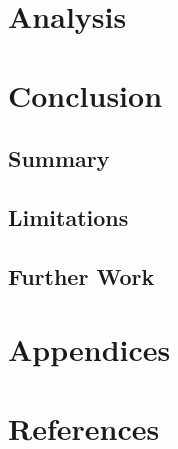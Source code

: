 \documentclass[10pt]{article}
\begin{document}
\section{Analysis}

\section{Conclusion}

\subsection{Summary}

\subsection{Limitations}

\subsection{Further Work}

\section{Appendices}

\section{References}
\printbibliography[heading=none] %

\end{document}
